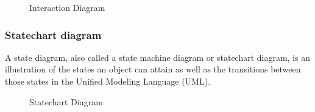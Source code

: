 \documentclass[12pt,a4paper]{report}
\begin{document}
\begin{figure}[h]
	\begin{center}
		\caption{Interaction Diagram}
	\end{center}
\end{figure}


\subsubsection{Statechart diagram}
A state diagram, also called a state machine diagram or statechart diagram, is an illustration of the states an object can attain as well as the transitions between those states in the Unified Modeling Language (UML).\\

\begin{figure}[h]
	\begin{center}
		\caption{Statechart Diagram}
	\end{center}
\end{figure}
\end{document}
